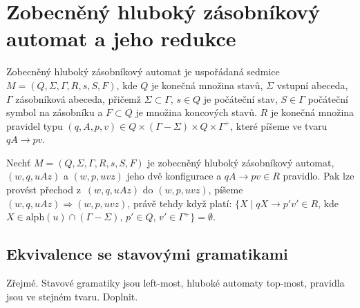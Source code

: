 
\chapter{Zobecněný hluboký zásobníkový automat a jeho redukce}


\begin{Def}
Zobecněný hluboký zásobníkový automat je uspořádaná sedmice $M = (Q,\Sigma,\Gamma, R, s, S, F)$, 
kde $Q$ je konečná množina stavů, $\Sigma$ vstupní abeceda, $\Gamma$ zásobníková abeceda, přičemž $\Sigma \subset \Gamma$,
$s \in Q$ je počáteční stav, $S \in \Gamma$ počáteční symbol na zásobníku a $F \subset Q$ je množina
koncových stavů. $R$ je konečná množina pravidel typu $(q, A, p, v) \in Q \times (\Gamma - \Sigma) \times Q \times {\Gamma}^+$, které píšeme ve tvaru $qA \rightarrow pv$. 
\end{Def}

\begin{Def}
Nechť $M = (Q,\Sigma,\Gamma, R, s, S, F)$ je zobecněný hluboký zásobníkový automat, $(w,q,uAz)$ a $(w,p,uvz)$ jeho dvě konfigurace a $qA \rightarrow pv \in R$ pravidlo. Pak lze provést přechod z~$(w,q,uAz)$ do $(w,p,uvz)$, píšeme $(w,q,uAz) {\Rightarrow} (w,p,uvz)$, právě tehdy když platí: $\{X \mid qX \rightarrow p'v' \in R$, kde $X \in \mathrm{alph}(u) \cap (\Gamma - \Sigma)$, $p' \in Q$, $v' \in {\Gamma}^+ \} = \emptyset$.
\end{Def}

 \section{Ekvivalence se stavovými gramatikami} \label{sec_ekv_state_grammars}


Zřejmé. Stavové gramatiky jsou left-most, hluboké automaty top-most, pravidla jsou ve stejném tvaru. Doplnit.

